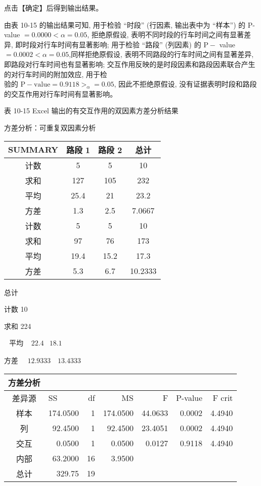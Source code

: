 \documentclass[10pt]{article}
\begin{document}
\begin{CJK*}{UTF8}{bsmi}
点击【确定】后得到输出结果。

由表 10-15 的输出结果可知, 用于检验 “时段” (行因素, 输出表中为 “样本”) 的 $\mathrm{P}$-value $=0.0000<\alpha=0.05$, 拒绝原假设, 表明不同时段的行车时间之间有显著差异, 即时段对行车时间有显著影响; 用于检验 “路段” (列因素) 的 $\mathrm{P}-$ value $=0.0002<\alpha=0.05$,同样拒绝原假设, 表明不同路段的行车时间之间有显著差异, 即路段对行车时间也有显著影响; 交互作用反映的是时段因素和路段因素联合产生的对行车时间的附加效应, 用于检\\
验的 $\mathrm{P}-\mathrm{value}=0.9118>_{\alpha}=0.05$, 因此不拒绝原假设, 没有证据表明时段和路段的交互作用对行车时间有显著影响。

表 10-15 Excel 输出的有交互作用的双因素方差分析结果

方差分析：可重复双因素分析

\begin{center}
\begin{tabular}{cccc}
\hline
SUMMARY & 路段 1 & 路段 2 & 总计 \\
\hline
计数 & 5 & 5 & 10 \\
求和 & 127 & 105 & 232 \\
平均 & 25.4 & 21 & 23.2 \\
方差 & 1.3 & 2.5 & 7.0667 \\
计数 & 5 & 5 & 10 \\
求和 & 97 & 76 & 173 \\
平均 & 19.4 & 15.2 & 17.3 \\
方差 & 5.3 & 6.7 & 10.2333 \\
\hline
\end{tabular}
\end{center}

总计

计数 10

求和 224

$\begin{array}{lll}\text { 平均 } & 22.4 & 18.1\end{array}$

方差 $\quad 12.9333 \quad 13.4333$

\begin{center}
\begin{tabular}{crrrrrr}
\hline
方差分析 &  &  &  &  &  &  \\
\hline
差异源 & \multicolumn{1}{l}{SS} & df & MS & F & P-value & F crit \\
样本 & 174.0500 & 1 & 174.0500 & 44.0633 & 0.0002 & 4.4940 \\
列 & 92.4500 & 1 & 92.4500 & 23.4051 & 0.0002 & 4.4940 \\
交互 & 0.0500 & 1 & 0.0500 & 0.0127 & 0.9118 & 4.4940 \\
内部 & 63.2000 & 16 & 3.9500 &  &  &  \\
总计 & 329.75 & 19 &  &  &  &  \\
\hline
\end{tabular}
\end{center}


\end{CJK*}
\end{document}
